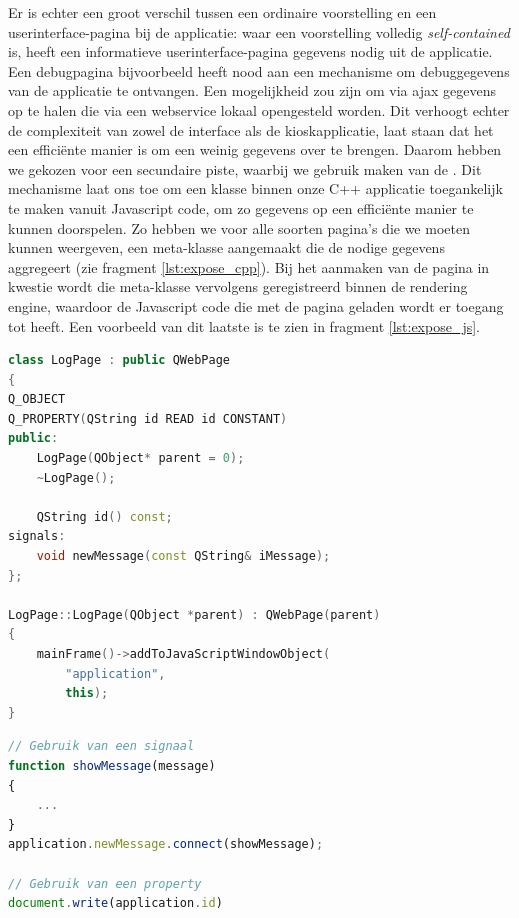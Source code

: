 Er is echter een groot verschil tussen een ordinaire voorstelling en een userinterface-pagina bij de applicatie: waar een voorstelling volledig \emph{self-contained} is, heeft een informatieve userinterface-pagina gegevens nodig uit de applicatie. Een debugpagina bijvoorbeeld heeft nood aan een mechanisme om debuggegevens van de applicatie te ontvangen.
Een mogelijkheid zou zijn om via \ac{ajax} gegevens op te halen die via een webservice lokaal opengesteld worden. Dit verhoogt echter de complexiteit van zowel de interface als de kioskapplicatie, laat staan dat het een efficiënte manier is om een weinig gegevens over te brengen. Daarom hebben we gekozen voor een secundaire piste, waarbij we gebruik maken van de . Dit mechanisme laat ons toe om een klasse binnen onze C++ applicatie toegankelijk te maken vanuit Javascript code, om zo gegevens op een efficiënte manier te kunnen doorspelen. Zo hebben we voor alle soorten pagina's die we moeten kunnen weergeven, een meta-klasse aangemaakt die de nodige gegevens aggregeert (zie fragment \ref{lst:expose_cpp}). Bij het aanmaken van de pagina in kwestie wordt die meta-klasse vervolgens geregistreerd binnen de rendering engine, waardoor de Javascript code die met de pagina geladen wordt er toegang tot heeft. Een voorbeeld van dit laatste is te zien in fragment \ref{lst:expose_js}.

\begin{lstlisting}[language=C++, float, caption=Registratie van een klasse binnen de rendering engine., label=lst:expose_cpp]
class LogPage : public QWebPage
{
Q_OBJECT
Q_PROPERTY(QString id READ id CONSTANT)
public:
    LogPage(QObject* parent = 0);
    ~LogPage();

    QString id() const;
signals:
    void newMessage(const QString& iMessage);
};

LogPage::LogPage(QObject *parent) : QWebPage(parent)
{
    mainFrame()->addToJavaScriptWindowObject(
    	"application",
        this);
}
\end{lstlisting}

\begin{lstlisting}[language=JavaScript, float, caption=Gebruik van een geregistreerde C++ klasse., label=lst:expose_js]
// Gebruik van een signaal
function showMessage(message)
{
	...
}
application.newMessage.connect(showMessage);

// Gebruik van een property
document.write(application.id)
\end{lstlisting}



